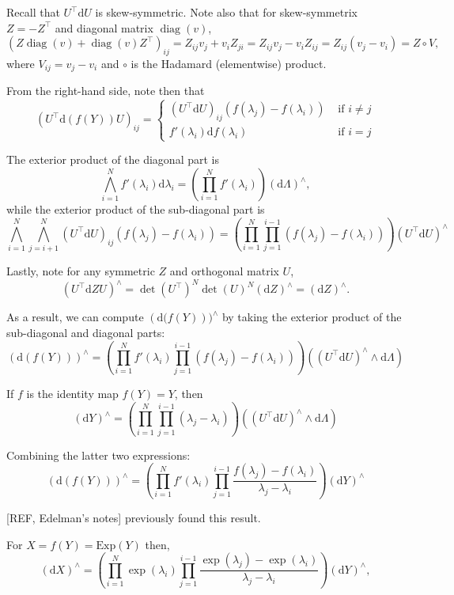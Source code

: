 \documentclass[11pt]{article}
\newcommand{\dv}[1]{\mathrm{d}{#1}}
\newcommand{\Exp}{\mathrm{Exp}}
\begin{document}
Recall that $U^\top \dv{U}$ is skew-symmetric.
Note also that for skew-symmetrix $Z = -Z^\top$ and diagonal matrix $\operatorname{diag}(v)$,
\[(Z\operatorname{diag}(v) + \operatorname{diag}(v)Z^\top)_{ij} = Z_{ij} v_j + v_i Z_{ji} = Z_{ij} v_j - v_i Z_{ij} = Z_{ij} (v_j - v_i) = Z \circ V,\]
where $V_{ij} = v_j - v_i$ and $\circ$ is the Hadamard (elementwise) product.

From the right-hand side, note then that
\[(U^\top \dv{(f(Y))} U)_{ij} = \begin{cases} (U^\top \dv{U})_{ij} (f(\lambda_j) - f(\lambda_i)) & \text{ if } i \ne j \\ f'(\lambda_i) \dv{f(\lambda_i)} &\text{ if } i = j \end{cases}\]

The exterior product of the diagonal part is
\[
  \bigwedge_{i=1}^N f'(\lambda_i) \dv{\lambda_i} = \left(\prod_{i=1}^N f'(\lambda_i)\right) (\dv{\Lambda})^\wedge,
\]
while the exterior product of the sub-diagonal part is
\[
  \bigwedge_{i=1}^N \bigwedge_{j=i+1}^N (U^\top \dv{U})_{ij} (f(\lambda_j) - f(\lambda_i)) = \left( \prod_{i=1}^N \prod_{j=1}^{i-1} (f(\lambda_j) - f(\lambda_i)) \right) \left(U^\top \dv{U} \right)^\wedge
\]

Lastly, note for any symmetric $Z$ and orthogonal matrix $U$,
\[(U^\top \dv{Z} U)^\wedge = \det(U^\top)^N \det(U)^N (\dv{Z})^\wedge = (\dv{Z})^\wedge.\]

As a result, we can compute $(\dv(f(Y)))^\wedge$ by taking the exterior product of the sub-diagonal and diagonal parts: 
\[(\dv{(f(Y))})^\wedge = \left(\prod_{i=1}^N f'(\lambda_i) \prod_{j=1}^{i-1} (f(\lambda_j) - f(\lambda_i))\right) \left((U^\top \dv{U})^\wedge \wedge \dv{\Lambda}\right)\]

If $f$ is the identity map $f(Y) = Y$, then
\[ (\dv{Y})^\wedge = \left(\prod_{i=1}^N \prod_{j=1}^{i-1} (\lambda_j - \lambda_i)\right) \left((U^\top \dv{U})^\wedge \wedge \dv{\Lambda}\right)\]

Combining the latter two expressions:
\[(\dv{(f(Y))})^\wedge = \left(\prod_{i=1}^N f'(\lambda_i) \prod_{j=1}^{i-1} \frac{f(\lambda_j) - f(\lambda_i)}{\lambda_j - \lambda_i}\right) (\dv{Y})^\wedge\]

[REF, Edelman's notes] previously found this result.

For $X = f(Y) = \Exp(Y)$ then,
\[ (\dv{X})^\wedge = \left(\prod_{i=1}^N \exp(\lambda_i) \prod_{j=1}^{i-1} \frac{\exp(\lambda_j) - \exp(\lambda_i)}{\lambda_j - \lambda_i}\right) (\dv{Y})^\wedge,\]
\end{document}
